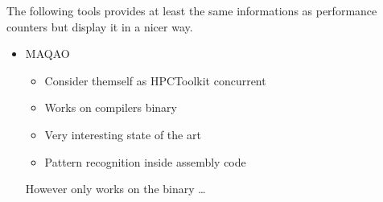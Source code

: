 The following tools provides at least the same informations as performance
counters but display it in a nicer way.
\begin{itemize}
    \item MAQAO~\cite{Djoudi05MAQAO}
        \begin{itemize}
            \item Consider themself as HPCToolkit concurrent
            \item Works on compilers binary
            \item Very interesting state of the art
            \item Pattern recognition inside assembly code
        \end{itemize}
        However only works on the binary \dots

\end{itemize}
